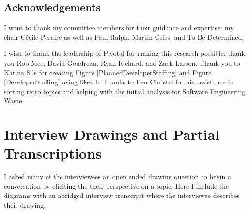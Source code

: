 \documentclass[oneside,letterpaper]{memoir}
\begin{document}
\frontmatter

\thetitlepage
\copyrightpage

\section*{Acknowledgements}
I want to thank my committee members for their guidance and expertise: my chair
 C\'ecile P\'eraire as well as Paul Ralph, Martin Griss, and To Be Determined. 

I wish to thank the leadership of Pivotal for making this research possible; thank you Rob Mee, David Goudreau, Ryan Richard, and Zach Larson. Thank you to Karina Sils for creating Figure \ref{PlannedDeveloperStaffing} and Figure \ref{DeveloperStaffing} using Sketch. Thanks to Ben Christel for his assistance in sorting retro topics and helping with the initial analysis for Software Engineering Waste.



\newpage
\tableofcontents
\listoftables
\listoffigures

\mainmatter



% 
% 
% 










\appendix


\chapter{Interview Drawings and Partial Transcriptions}
\label{AppendixInterviews}
I asked many of the interviewees an open ended drawing question to begin a conversation by eliciting the their perspective on a topic. Here I include the diagrams with an abridged interview transcript where the interviewee describes their drawing.









\backmatter
\end{document}
